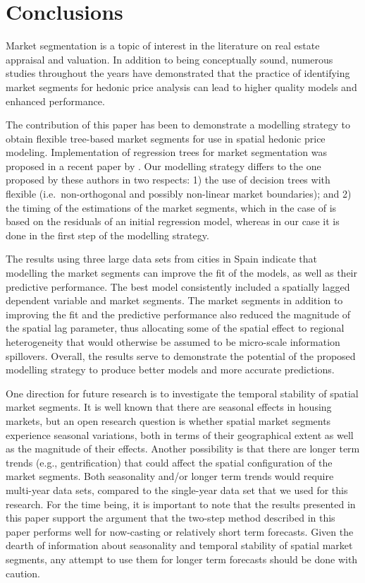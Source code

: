 \documentclass[Royal,times,sageh]{sagej}
\begin{document}
\hypertarget{conclusions}{%
\section{Conclusions}\label{conclusions}}

Market segmentation is a topic of interest in the literature on real
estate appraisal and valuation. In addition to being conceptually sound,
numerous studies throughout the years have demonstrated that the
practice of identifying market segments for hedonic price analysis can
lead to higher quality models and enhanced performance.

The contribution of this paper has been to demonstrate a modelling
strategy to obtain flexible tree-based market segments for use in
spatial hedonic price modeling. Implementation of regression trees for
market segmentation was proposed in a recent paper by
\citet{Fuss2016role}. Our modelling strategy differs to the one proposed
by these authors in two respects: 1) the use of decision trees with
flexible (i.e.~non-orthogonal and possibly non-linear market
boundaries); and 2) the timing of the estimations of the market
segments, which in the case of \citet{Fuss2016role} is based on the
residuals of an initial regression model, whereas in our case it is done
in the first step of the modelling strategy.

The results using three large data sets from cities in Spain indicate
that modelling the market segments can improve the fit of the models, as
well as their predictive performance. The best model consistently
included a spatially lagged dependent variable and market segments. The
market segments in addition to improving the fit and the predictive
performance also reduced the magnitude of the spatial lag parameter,
thus allocating some of the spatial effect to regional heterogeneity
that would otherwise be assumed to be micro-scale information
spillovers. Overall, the results serve to demonstrate the potential of
the proposed modelling strategy to produce better models and more
accurate predictions.

One direction for future research is to investigate the temporal
stability of spatial market segments. It is well known that there are
seasonal effects in housing markets, but an open research question is
whether spatial market segments experience seasonal variations, both in
terms of their geographical extent as well as the magnitude of their
effects. Another possibility is that there are longer term trends (e.g.,
gentrification) that could affect the spatial configuration of the
market segments. Both seasonality and/or longer term trends would
require multi-year data sets, compared to the single-year data set that
we used for this research. For the time being, it is important to note
that the results presented in this paper support the argument that the
two-step method described in this paper performs well for now-casting or
relatively short term forecasts. Given the dearth of information about
seasonality and temporal stability of spatial market segments, any
attempt to use them for longer term forecasts should be done with
caution.
\end{document}
